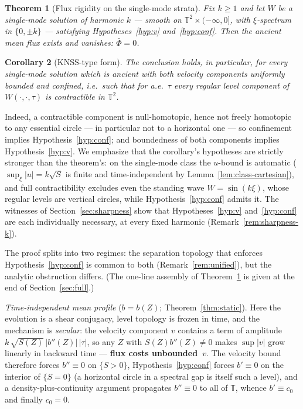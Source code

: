 \documentclass[11pt]{amsart}
\newtheorem{theorem}{Theorem}[section]
\newtheorem{corollary}[theorem]{Corollary}
\theoremstyle{definition}
\theoremstyle{remark}
\newcommand{\T}{\mathbb{T}}
\newcommand{\Fbar}{\bar\Phi}
\begin{document}
\begin{theorem}[Flux rigidity on the single-mode strata]
\label{thm:main-intro}
Fix $k\ge1$ and let $W$ be a single-mode solution of harmonic $k$
--- smooth on $\T^2\times(-\infty,0]$, with $\xi$-spectrum in
$\{0,\pm k\}$ --- satisfying Hypotheses~\ref{hyp:v} and~\ref{hyp:conf}.
Then the ancient mean flux exists and vanishes: $\Fbar=0$.
\end{theorem}

\begin{corollary}[KNSS-type form]\label{cor:knss}
The conclusion holds, in particular, for every single-mode solution which
is ancient with \emph{both} velocity components uniformly bounded and
\emph{confined}, i.e.\ such that for a.e.\ $\tau$ every regular level
component of $W(\cdot,\cdot,\tau)$ is contractible in $\T^2$.
\end{corollary}

Indeed, a contractible component is null-homotopic, hence not freely
homotopic to any essential circle --- in particular not to a horizontal
one --- so confinement implies Hypothesis~\ref{hyp:conf}; and
boundedness of both components implies Hypothesis~\ref{hyp:v}. We
emphasize that the corollary's hypotheses are strictly stronger than the
theorem's: on the single-mode class the $u$-bound is automatic
($\sup_\xi|u|=k\sqrt S$ is finite and time-independent by
Lemma~\ref{lem:class-cartesian}), and full contractibility excludes even
the standing wave $W=\sin(k\xi)$, whose regular levels are vertical
circles, while Hypothesis~\ref{hyp:conf} admits it. The witnesses of
Section~\ref{sec:sharpness} show that Hypotheses~\ref{hyp:v}
and~\ref{hyp:conf} are each individually necessary, at every fixed
harmonic (Remark~\ref{rem:sharpness-k}).

The proof splits into two regimes: the separation topology that enforces
Hypothesis~\ref{hyp:conf} is common to both (Remark~\ref{rem:unified}),
but the analytic obstruction differs. (The one-line assembly of
Theorem~\ref{thm:main-intro} is given at the end of
Section~\ref{sec:full}.)

\emph{Time-independent mean profile} ($b=b(Z)$; Theorem~\ref{thm:static}).
Here the evolution is a shear conjugacy, level topology is frozen in
time, and the mechanism is \emph{secular}: the velocity component $v$
contains a term of amplitude $k\,\sqrt{S(Z)}\,|b''(Z)|\,|\tau|$, so any
$Z$ with $S(Z)b''(Z)\neq0$ makes $\sup|v|$ grow linearly in backward time
--- \textbf{flux costs unbounded~$v$}. The velocity bound therefore
forces $b''\equiv0$ on $\{S>0\}$, Hypothesis~\ref{hyp:conf} forces
$b'\equiv0$ on the interior of $\{S=0\}$ (a horizontal circle in a
spectral gap is itself such a level), and a
density-plus-continuity argument propagates $b''\equiv0$ to all of $\T$,
whence $b'\equiv c_0$ and finally $c_0=0$.
\end{document}
